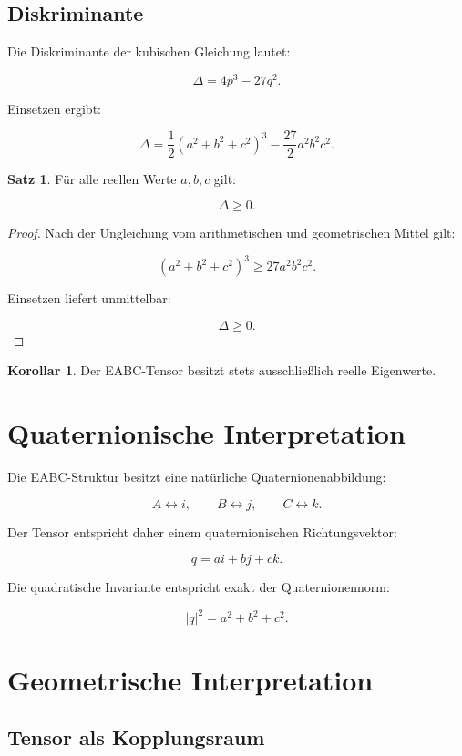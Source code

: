 \documentclass[11pt,a4paper]{article}
\theoremstyle{definition}
\newtheorem{satz}{Satz}
\newtheorem{korollar}{Korollar}
\begin{document}
	\subsection{Diskriminante}
	
	Die Diskriminante der kubischen Gleichung lautet:
	
	\[
	\Delta=4p^3-27q^2.
	\]
	
	Einsetzen ergibt:
	
	\[
	\Delta=
	\frac12(a^2+b^2+c^2)^3
	-\frac{27}{2}a^2b^2c^2.
	\]
	
	\begin{satz}
		Für alle reellen Werte \(a,b,c\) gilt:
		
		\[
		\Delta\ge0.
		\]
	\end{satz}
	
	\begin{proof}
		Nach der Ungleichung vom arithmetischen und geometrischen Mittel gilt:
		
		\[
		(a^2+b^2+c^2)^3
		\ge
		27a^2b^2c^2.
		\]
		
		Einsetzen liefert unmittelbar:
		
		\[
		\Delta\ge0.
		\]
	\end{proof}
	
	\begin{korollar}
		Der EABC-Tensor besitzt stets ausschließlich reelle Eigenwerte.
	\end{korollar}
	
	\section{Quaternionische Interpretation}
	
	Die EABC-Struktur besitzt eine natürliche Quaternionenabbildung:
	
	\[
	A\leftrightarrow i,
	\qquad
	B\leftrightarrow j,
	\qquad
	C\leftrightarrow k.
	\]
	
	Der Tensor entspricht daher einem quaternionischen Richtungsvektor:
	
	\[
	q=ai+bj+ck.
	\]
	
	Die quadratische Invariante entspricht exakt der Quaternionennorm:
	
	\[
	|q|^2=a^2+b^2+c^2.
	\]
	
	\section{Geometrische Interpretation}
	
	\subsection{Tensor als Kopplungsraum}
	
\end{document}
